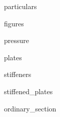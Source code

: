 ^^^particulars

^^^figures

^^^pressure

^^^plates

^^^stiffeners

^^^stiffened_plates

^^^ordinary_section

\clearpage
\restoregeometry